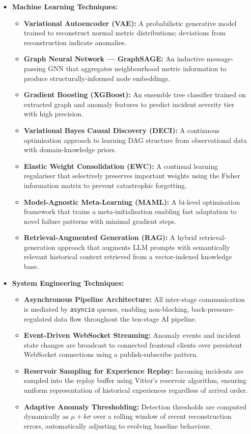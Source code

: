 \begin{itemize}

    \item \textbf{Machine Learning Techniques:}
    \begin{itemize}
        \item \textbf{Variational Autoencoder (VAE):} A probabilistic generative model trained to reconstruct normal metric distributions; deviations from reconstruction indicate anomalies.
        \item \textbf{Graph Neural Network — GraphSAGE:} An inductive message-passing GNN that aggregates neighbourhood metric information to produce structurally-informed node embeddings.
        \item \textbf{Gradient Boosting (XGBoost):} An ensemble tree classifier trained on extracted graph and anomaly features to predict incident severity tier with high precision.
        \item \textbf{Variational Bayes Causal Discovery (DECI):} A continuous optimisation approach to learning DAG structure from observational data with domain-knowledge priors.
        \item \textbf{Elastic Weight Consolidation (EWC):} A continual learning regulariser that selectively preserves important weights using the Fisher information matrix to prevent catastrophic forgetting.
        \item \textbf{Model-Agnostic Meta-Learning (MAML):} A bi-level optimisation framework that trains a meta-initialisation enabling fast adaptation to novel failure patterns with minimal gradient steps.
        \item \textbf{Retrieval-Augmented Generation (RAG):} A hybrid retrieval-generation approach that augments LLM prompts with semantically relevant historical context retrieved from a vector-indexed knowledge base.
    \end{itemize}

    \item \textbf{System Engineering Techniques:}
    \begin{itemize}
        \item \textbf{Asynchronous Pipeline Architecture:} All inter-stage communication is mediated by \texttt{asyncio} queues, enabling non-blocking, back-pressure-regulated data flow throughout the ten-stage AI pipeline.
        \item \textbf{Event-Driven WebSocket Streaming:} Anomaly events and incident state changes are broadcast to connected frontend clients over persistent WebSocket connections using a publish-subscribe pattern.
        \item \textbf{Reservoir Sampling for Experience Replay:} Incoming incidents are sampled into the replay buffer using Vitter's reservoir algorithm, ensuring uniform representation of historical experiences regardless of arrival order.
        \item \textbf{Adaptive Anomaly Thresholding:} Detection thresholds are computed dynamically as $\mu + k\sigma$ over a rolling window of recent reconstruction errors, automatically adjusting to evolving baseline behaviour.
    \end{itemize}


\end{itemize}
